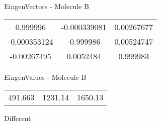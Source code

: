 \begin{multicols}{2}
\begin{center}
\vtab
 EingenVectors - Molecule B     \\
\vtab
\begin{tabular}{|c c c|}
0.999996	 & 	-0.000339081	 & 	0.00267677	 \\
-0.000353124	 & 	-0.999986	 & 	0.00524747	 \\
-0.00267495	 & 	0.0052484	 & 	0.999983
\end{tabular}

\vtab
 EingenValues - Molecule B     \\
\vtab
\begin{tabular}{|c c c|}
491.663	 & 	1231.14	 & 	1650.13	 \\
\end{tabular}

\end{center}
\end{multicols}
\begin{center}
\vtab
\vtab
\textcolor{NavyBlue}{\Large Different}
\end{center}

 \newpage


